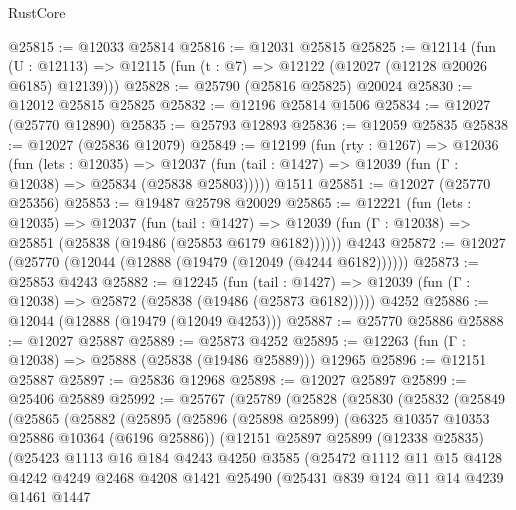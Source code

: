 \begin{lexlean}{RustCore}
\begin{coremodule}
@25815 := @12033 @25814
@25816 := @12031 @25815
@25825 := @12114
    (fun (U : @12113) => @12115 (fun (t : @7) => @12122 (@12027 (@12128 @20026 @6185) @12139)))
@25828 := @25790 (@25816 @25825) @20024
@25830 := @12012 @25815 @25825
@25832 := @12196 @25814 @1506
@25834 := @12027 (@25770 @12890)
@25835 := @25793 @12893
@25836 := @12059 @25835
@25838 := @12027 (@25836 @12079)
@25849 := @12199
    (fun (rty : @1267) =>
    @12036
      (fun (lets : @12035) =>
      @12037 (fun (tail : @1427) => @12039 (fun (Γ : @12038) => @25834 (@25838 @25803)))))
    @1511
@25851 := @12027 (@25770 @25356)
@25853 := @19487 @25798 @20029
@25865 := @12221
    (fun (lets : @12035) =>
    @12037
      (fun (tail : @1427) =>
      @12039 (fun (Γ : @12038) => @25851 (@25838 (@19486 (@25853 @6179 @6182))))))
    @4243
@25872 := @12027 (@25770 (@12044 (@12888 (@19479 (@12049 (@4244 @6182))))))
@25873 := @25853 @4243
@25882 := @12245
    (fun (tail : @1427) => @12039 (fun (Γ : @12038) => @25872 (@25838 (@19486 (@25873 @6182)))))
    @4252
@25886 := @12044 (@12888 (@19479 (@12049 @4253)))
@25887 := @25770 @25886
@25888 := @12027 @25887
@25889 := @25873 @4252
@25895 := @12263 (fun (Γ : @12038) => @25888 (@25838 (@19486 @25889))) @12965
@25896 := @12151 @25887
@25897 := @25836 @12968
@25898 := @12027 @25897
@25899 := @25406 @25889
@25992 := @25767
    (@25789
      (@25828
        (@25830
          (@25832
            (@25849
              (@25865
                (@25882
                  (@25895
                    (@25896
                      (@25898 @25899)
                      (@6325 @10357 @10353 @25886 @10364 (@6196 @25886))
                      (@12151
                        @25897
                        @25899
                        (@12338 @25835)
                        (@25423
                          @1113
                          @16
                          @184
                          @4243
                          @4250
                          @3585
                          (@25472
                            @1112
                            @11
                            @15
                            @4128
                            @4242
                            @4249
                            @2468
                            @4208
                            @1421
                            @25490
                            (@25431
                              @839
                              @124
                              @11
                              @14
                              @4239
                              @1461
                              @1447

\end{coremodule}
\end{lexlean}
